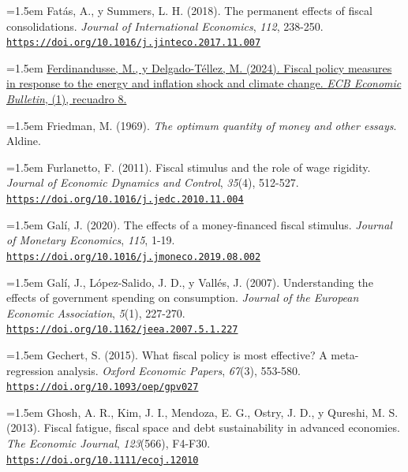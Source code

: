 \documentclass[10pt,a4paper]{article}
\begin{document}
\noindent\hangindent=1.5em Fatás, A., y Summers, L. H. (2018). The permanent effects of fiscal consolidations. \textit{Journal of International Economics}, \textit{112}, 238-250. \href{https://doi.org/10.1016/j.jinteco.2017.11.007}{\nolinkurl{https://doi.org/10.1016/j.jinteco.2017.11.007}}

\noindent\hangindent=1.5em \href{https://www.ecb.europa.eu/pub/economic-bulletin/focus/2024/html/ecb.ebbox202401_08~d136db2a83.en.html}{Ferdinandusse, M., y Delgado-Téllez, M. (2024). Fiscal policy measures in response to the energy and inflation shock and climate change. \textit{ECB Economic Bulletin}, (1), recuadro 8.}

\noindent\hangindent=1.5em Friedman, M. (1969). \textit{The optimum quantity of money and other essays}. Aldine.

\noindent\hangindent=1.5em Furlanetto, F. (2011). Fiscal stimulus and the role of wage rigidity. \textit{Journal of Economic Dynamics and Control}, \textit{35}(4), 512-527. \href{https://doi.org/10.1016/j.jedc.2010.11.004}{\nolinkurl{https://doi.org/10.1016/j.jedc.2010.11.004}}

\noindent\hangindent=1.5em Galí, J. (2020). The effects of a money-financed fiscal stimulus. \textit{Journal of Monetary Economics}, \textit{115}, 1-19. \href{https://doi.org/10.1016/j.jmoneco.2019.08.002}{\nolinkurl{https://doi.org/10.1016/j.jmoneco.2019.08.002}}

\noindent\hangindent=1.5em Galí, J., López-Salido, J. D., y Vallés, J. (2007). Understanding the effects of government spending on consumption. \textit{Journal of the European Economic Association}, \textit{5}(1), 227-270. \href{https://doi.org/10.1162/jeea.2007.5.1.227}{\nolinkurl{https://doi.org/10.1162/jeea.2007.5.1.227}}

\noindent\hangindent=1.5em Gechert, S. (2015). What fiscal policy is most effective? A meta-regression analysis. \textit{Oxford Economic Papers}, \textit{67}(3), 553-580. \href{https://doi.org/10.1093/oep/gpv027}{\nolinkurl{https://doi.org/10.1093/oep/gpv027}}

\noindent\hangindent=1.5em Ghosh, A. R., Kim, J. I., Mendoza, E. G., Ostry, J. D., y Qureshi, M. S. (2013). Fiscal fatigue, fiscal space and debt sustainability in advanced economies. \textit{The Economic Journal}, \textit{123}(566), F4-F30. \href{https://doi.org/10.1111/ecoj.12010}{\nolinkurl{https://doi.org/10.1111/ecoj.12010}}
\end{document}
